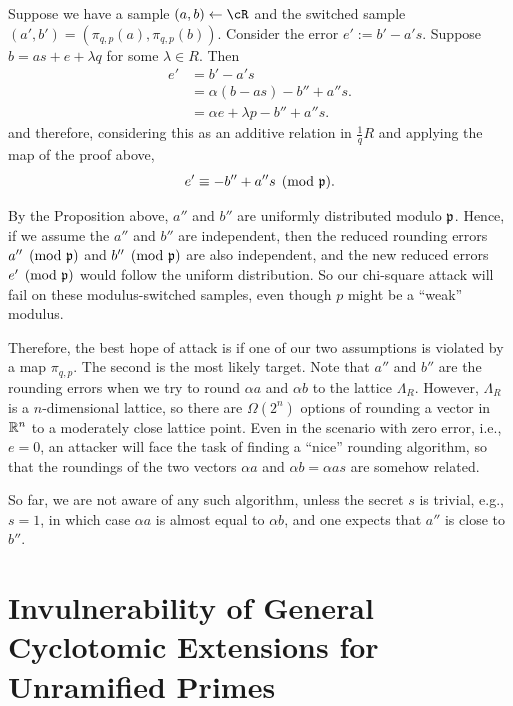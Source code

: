 \documentclass[envcountsame]{llncs}
\begin{document}
Suppose we have a sample $(a,b) \gets \cR$ and the switched sample $(a', b') = (\pi_{q,p}(a),\pi_{q,p}(b))$. Consider the error $e':= b' - a's$. Suppose $b = as+e+ \lambda q$ for some $\lambda \in R$. Then
\begin{align*}
    e' &= b' - a's  \\
    &= \alpha(b-as) - b''  + a''s. \\
    & = \alpha e + \lambda p - b'' + a''s.
\end{align*}
and therefore, considering this as an additive relation in $\frac{1}{q}R$ and applying the map of the proof above,
$$e' \equiv - b'' + a'' s \pmod{\mathfrak{p}}.$$

By the Proposition above, $a''$ and $b''$ are uniformly distributed modulo $\mathfrak{p}$.  Hence, if we assume the $a''$ and $b''$ are independent, then the reduced rounding errors $a'' \pmod{\mathfrak{p}}$ and $b'' \pmod{\mathfrak{p}}$ are also independent, and the new reduced errors $e' \pmod{\mathfrak{p}}$ would follow the uniform distribution. So our chi-square attack will fail on these modulus-switched samples, even though $p$ might be a ``weak'' modulus.

Therefore, the best hope of attack is if one of our two assumptions is violated by a map $\pi_{q,p}$.  The second is the most likely target.  Note that $a''$ and $b''$ are the rounding errors when we try to round $\alpha a$ and $\alpha b$ to the lattice $\Lambda_R$. However, $\Lambda_R$ is a $n$-dimensional lattice, so there are $\Omega(2^n)$ options of rounding a vector in $\mathbb{R}^n$ to a moderately close lattice point. Even in the scenario with zero error, i.e., $e = 0$, an attacker will face the task of finding a ``nice'' rounding algorithm, so that the roundings of the two vectors $\alpha a$ and $\alpha b = \alpha a s$ are somehow related.

So far, we are not aware of any such algorithm, unless the secret $s$ is trivial, e.g., $s = 1$, in which case $\alpha a$ is almost equal to $\alpha b$, and one expects that $a''$ is close to $b''$.



\section{Invulnerability of General Cyclotomic Extensions for Unramified Primes}
\label{sec: cyclo-secure}
\end{document}
